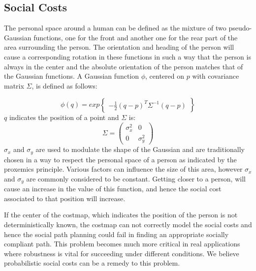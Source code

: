 
\subsection{Social Costs}


The personal space around a human can be defined as the mixture of two pseudo-Gaussian functions, one for the front and another one for the rear part of the area surrounding the person. The orientation and heading of the person will cause a corresponding rotation in these functions in such a way that the person is always in the center and the absolute orientation of the person matches that of the Gaussian functions. 
A Gaussian function $\phi$, centered on $p$ with covariance matrix $\Sigma$, is defined as follows:

\begin{equation}
\phi(q) = exp\begin{Bmatrix}
-\frac{1}{2}(q-p)^{T}\Sigma^{-1}(q-p)
\end{Bmatrix}\end{equation}
$q$ indicates the position of a point and $\Sigma$ is:
\begin{equation}
\Sigma = \begin{pmatrix}
{\sigma}_{x}^2  & 0\\ 
 0& {\sigma}_{y}^2 
\end{pmatrix}
\end{equation}
${\sigma}_{x}$ and ${\sigma}_{y}$ are used to modulate the shape of the Gaussian and are traditionally chosen in a way to respect the personal space of a person as indicated by the proxemics principle. Various factors can influence the size of this area, however ${\sigma}_{x}$ and ${\sigma}_{y}$ are commonly considered to be constant. Getting closer to a person, will cause an increase in the value of this function, and hence the social cost associated to that position will increase.

If the center of the costmap, which indicates the position of the person is not deterministically known, the costmap can not correctly model the social costs and hence the social path planning could fail in finding an appropriate socially compliant path. This problem becomes much more critical in real applications where robustness is vital for succeeding under different conditions. We believe probabilistic social costs can be a remedy to this problem. 


